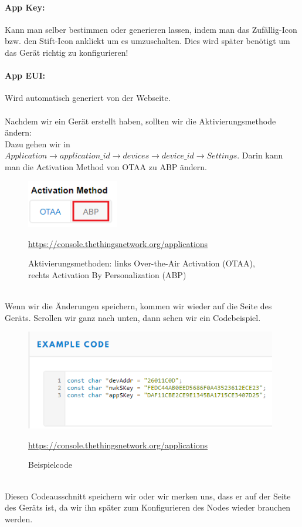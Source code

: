 \paragraph{App Key:} Kann man selber bestimmen oder generieren lassen, indem man das Zufällig-Icon bzw. den Stift-Icon anklickt um es umzuschalten. Dies wird später benötigt um das Gerät richtig zu konfigurieren!

\paragraph{App EUI:} Wird automatisch generiert von der Webseite.\\
\\
Nachdem wir ein Gerät erstellt haben, sollten wir die Aktivierungsmethode ändern:\\
Dazu gehen wir in $Application \rightarrow application\_id \rightarrow devices \rightarrow device\_id \rightarrow Settings$. Darin kann man die Activation Method von OTAA zu ABP ändern.
\begin{figure}[ht]
    \center
    \includegraphics[width=4cm]{Bilder/lora-6.png}\\
    \caption{Aktivierungsmethoden: links Over-the-Air Activation (OTAA), rechts Activation By Personalization (ABP)}
    \begin{center} \quelle\url{https://console.thethingsnetwork.org/applications} \end{center}
\end{figure}\\
Wenn wir die Änderungen speichern, kommen wir wieder auf die Seite des Geräts. Scrollen wir ganz nach unten, dann sehen wir ein Codebeispiel.
\begin{figure}[ht]
    \center
    \includegraphics[width=11cm]{Bilder/lora-7.png}\\
    \caption{Beispielcode}
    \begin{center} \quelle\url{https://console.thethingsnetwork.org/applications} \end{center}
    \label{fig:beispielcode}
\end{figure}\\
Diesen Codeausschnitt speichern wir oder wir merken uns, dass er auf der Seite des Geräts ist, da wir ihn später zum Konfigurieren des Nodes wieder brauchen werden. 
